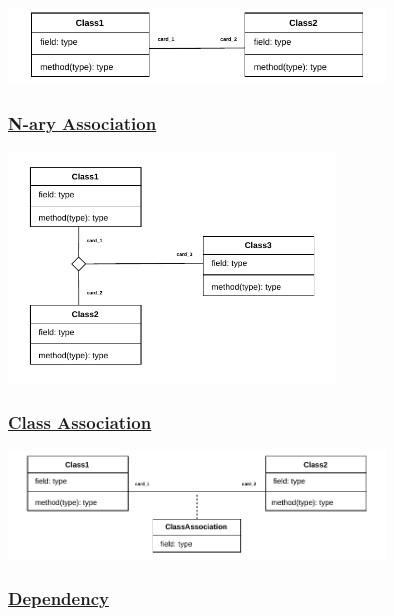 \begin{center}
   \includegraphics[width=0.75\textwidth]{Chapters/Diagram/OOP/Sum/SAssoc/simpleassoc.drawio.pdf}
\end{center}

\subsubsection*{\underline{N-ary Association}}

\begin{center}
\includegraphics[width=0.65\textwidth]{Chapters/Diagram/OOP/Sum/NaryAssoc/naryassoc.drawio.pdf}
\end{center}

\subsubsection*{\underline{Class Association}}

\begin{center}
\includegraphics[width=0.75\textwidth]{Chapters/Diagram/OOP/Sum/Class Association/classassoc.drawio.pdf}
\end{center}

\subsubsection*{\underline{Dependency}}

